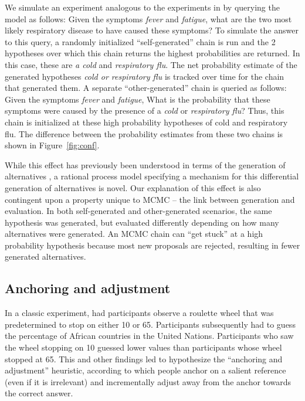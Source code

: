 We simulate an experiment analogous to the experiments in \cite{conf} by querying the model as follows: Given  the symptoms \emph{fever} and \emph{fatigue}, what are the two most likely respiratory disease to have caused these symptoms? To simulate the answer to this query, a randomly initialized ``self-generated'' chain is run and the 2 hypotheses over which this chain returns the highest probabilities are returned. In this case, these are \emph{a cold} and \emph{respiratory flu}. The net probability estimate of the generated hypotheses \emph{cold or respiratory flu} is tracked over time for the chain that generated them. A separate ``other-generated'' chain is queried as follows: Given the symptoms \emph{fever} and \emph{fatigue}, What is the probability that these symptoms were caused by the presence of a \textit{cold} or \textit{respiratory flu}? Thus, this chain is initialized at these high probability hypotheses of cold and respiratory flu. The difference between the probability estimates from these two chains is shown in Figure~\ref{fig:conf}.


While this effect has previously been understood in terms of the generation of alternatives \citep{conf}, a rational process model specifying a mechanism for this differential generation of alternatives is novel. 
Our explanation of this effect is also contingent upon a property unique to MCMC -- the link between generation and evaluation. In both self-generated and other-generated scenarios, the same hypothesis was generated, but evaluated differently depending on how many alternatives were generated. An MCMC chain can ``get stuck'' at a high probability hypothesis because most new proposals are rejected, resulting in fewer generated alternatives. 


\subsection{Anchoring and adjustment}

In a classic experiment, \citet{tversky} had participants observe a roulette wheel that was predetermined to stop on either 10 or 65. Participants subsequently had to guess the percentage of African countries in the United Nations. Participants who saw the wheel stopping on 10 guessed lower values than participants whose wheel stopped at 65. This and other findings led \citet{tversky} to hypothesize the ``anchoring and adjustment'' heuristic, according to which people anchor on a salient reference (even if it is irrelevant) and incrementally adjust away from the anchor towards the correct answer.

